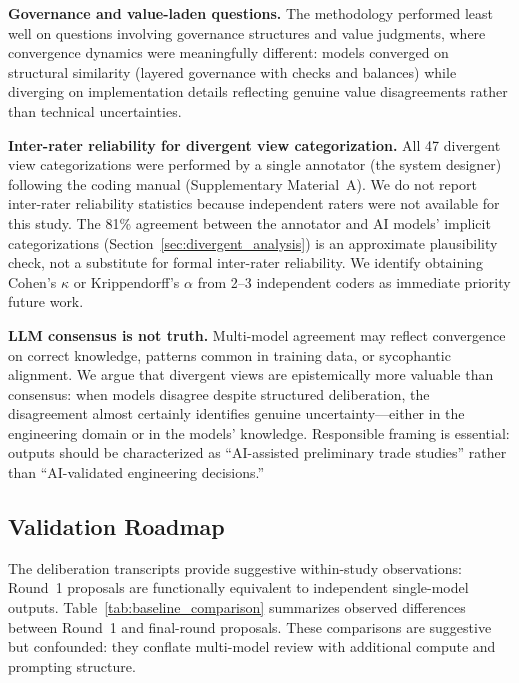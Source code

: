 \documentclass[11pt,a4paper]{article}
\begin{document}
\textbf{Governance and value-laden questions.} The methodology performed least well on questions involving governance structures and value judgments, where convergence dynamics were meaningfully different: models converged on structural similarity (layered governance with checks and balances) while diverging on implementation details reflecting genuine value disagreements rather than technical uncertainties.

\textbf{Inter-rater reliability for divergent view categorization.} All 47 divergent view categorizations were performed by a single annotator (the system designer) following the coding manual (Supplementary Material~A). We do not report inter-rater reliability statistics because independent raters were not available for this study. The 81\% agreement between the annotator and AI models' implicit categorizations (Section~\ref{sec:divergent_analysis}) is an approximate plausibility check, not a substitute for formal inter-rater reliability. We identify obtaining Cohen's $\kappa$ or Krippendorff's $\alpha$ from 2--3 independent coders as immediate priority future work.

\textbf{LLM consensus is not truth.} Multi-model agreement may reflect convergence on correct knowledge, patterns common in training data, or sycophantic alignment. We argue that divergent views are epistemically more valuable than consensus: when models disagree despite structured deliberation, the disagreement almost certainly identifies genuine uncertainty---either in the engineering domain or in the models' knowledge. Responsible framing is essential: outputs should be characterized as ``AI-assisted preliminary trade studies'' rather than ``AI-validated engineering decisions.''

\subsection{Validation Roadmap}
\label{sec:validation_roadmap}

The deliberation transcripts provide suggestive within-study observations: Round~1 proposals are functionally equivalent to independent single-model outputs. Table~\ref{tab:baseline_comparison} summarizes observed differences between Round~1 and final-round proposals. These comparisons are suggestive but confounded: they conflate multi-model review with additional compute and prompting structure.
\end{document}
